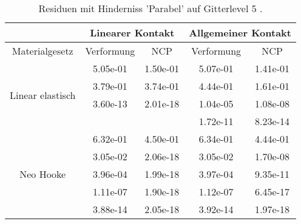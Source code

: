\begin{table} 
\centering 
\begin{tabular}{c|cc|cc|} 
\cline{2-5} 
 & \multicolumn{2}{|c|}{Linearer Kontakt} & \multicolumn{2}{|c|}{Allgemeiner Kontakt} \\ 
\hline 
\multicolumn{1}{|c|}{Materialgesetz} & \multicolumn{1}{c|}{Verformung} & \multicolumn{1}{c|}{NCP} & \multicolumn{1}{c|}{Verformung} & \multicolumn{1}{c|}{NCP} \\ 
\hline 
\multicolumn{1}{|c|}{\multirow{4}{*}{Linear elastisch}} &\multicolumn{1}{|c|}{  5.05e-01} & \multicolumn{1}{|c|}{  1.50e-01} & \multicolumn{1}{|c|}{  5.07e-01} & \multicolumn{1}{|c|}{  1.41e-01} \\ 
\multicolumn{1}{|c|}{} & \multicolumn{1}{|c|}{  3.79e-01} & \multicolumn{1}{|c|}{  3.74e-01} & \multicolumn{1}{|c|}{  4.44e-01} & \multicolumn{1}{|c|}{  1.61e-01} \\ 
\multicolumn{1}{|c|}{} & \multicolumn{1}{|c|}{  3.60e-13} & \multicolumn{1}{|c|}{  2.01e-18} & \multicolumn{1}{|c|}{  1.04e-05} & \multicolumn{1}{|c|}{  1.08e-08} \\ 
\multicolumn{1}{|c|}{} & \multicolumn{1}{|c|}{} & \multicolumn{1}{|c|}{} & \multicolumn{1}{|c|}{  1.72e-11} & \multicolumn{1}{|c|}{  8.23e-14} \\ 
\hline 
\multicolumn{1}{|c|}{\multirow{5}{*}{Neo Hooke}} &\multicolumn{1}{|c|}{  6.32e-01} & \multicolumn{1}{|c|}{  4.50e-01} & \multicolumn{1}{|c|}{  6.34e-01} & \multicolumn{1}{|c|}{  4.44e-01} \\ 
\multicolumn{1}{|c|}{} & \multicolumn{1}{|c|}{  3.05e-02} & \multicolumn{1}{|c|}{  2.06e-18} & \multicolumn{1}{|c|}{  3.05e-02} & \multicolumn{1}{|c|}{  1.70e-08} \\ 
\multicolumn{1}{|c|}{} & \multicolumn{1}{|c|}{  3.96e-04} & \multicolumn{1}{|c|}{  1.99e-18} & \multicolumn{1}{|c|}{  3.97e-04} & \multicolumn{1}{|c|}{  9.35e-11} \\ 
\multicolumn{1}{|c|}{} & \multicolumn{1}{|c|}{  1.11e-07} & \multicolumn{1}{|c|}{  1.90e-18} & \multicolumn{1}{|c|}{  1.12e-07} & \multicolumn{1}{|c|}{  6.45e-17} \\ 
\multicolumn{1}{|c|}{} & \multicolumn{1}{|c|}{  3.88e-14} & \multicolumn{1}{|c|}{  2.05e-18} & \multicolumn{1}{|c|}{  3.92e-14} & \multicolumn{1}{|c|}{  1.97e-18} \\ 
\hline 
\end{tabular}\caption{Residuen mit Hinderniss 'Parabel' auf Gitterlevel 5 .}\label{tab:Residuum_Parabel_level5}
\end{table} 
